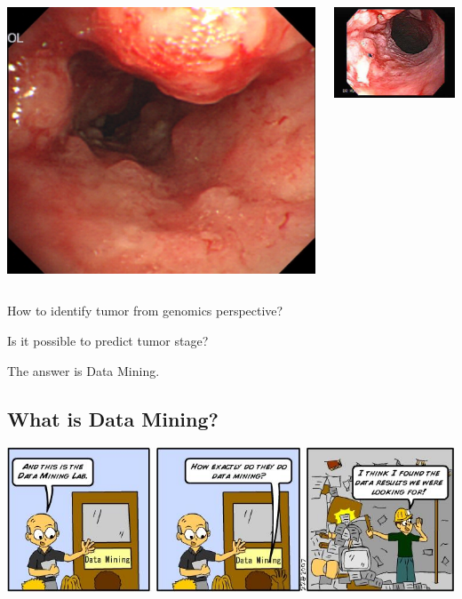 \documentclass[UTF8]{beamer}\usepackage[]{graphicx}\usepackage[]{color}
\begin{document}
\begin{frame}
  \begin{columns}
\begin{column}{.5\textwidth}
  \includegraphics[width=.5\textwidth]{escc.jpg}
\end{column}
\begin{column}{.5\textwidth}
  \includegraphics[width=\textwidth]{esccNormal.jpg}
\end{column}
\end{columns}

\centerline{How to identify tumor from genomics perspective?}
\centerline{Is it possible to predict tumor stage?}

\centerline{\huge{The answer is Data Mining.}}
\end{frame}

\subsection{What is Data Mining?}


\begin{frame}[fragile]
\includegraphics[width=.7\textwidth]{humor.jpg}
\end{frame}
\end{document}

